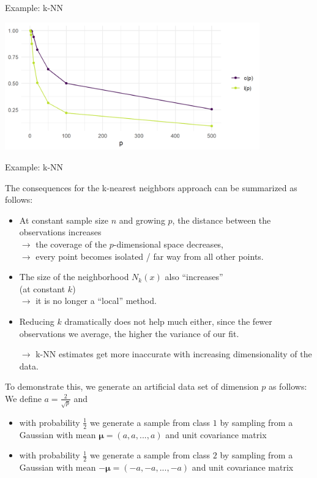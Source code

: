 \begin{vbframe}{Example: k-NN}
\begin{center}
\includegraphics[width = 11cm ]{figure/knn_contrast_locality_plot.png}
\end{center}

\end{vbframe}
\begin{vbframe}{Example: k-NN}


The consequences for the k-nearest neighbors approach can be summarized as follows:

\begin{itemize}
 \item At constant sample size $n$ and growing $p$, the distance between the observations increases\\
 $\rightarrow$ the coverage of the $p$-dimensional space decreases,\\
 $\rightarrow$ every point becomes isolated / far way from all other points.
 \item The size of the neighborhood $N_k(x)$ also \enquote{increases}\\
       (at constant $k$) \\
       $\rightarrow$ it is no longer a \enquote{local} method.
 \item Reducing $k$ dramatically does not help much either,
since the fewer observations we average, the higher the variance of our fit.
 \item[$\rightarrow$] k-NN estimates get more inaccurate with increasing dimensionality of the data.
\end{itemize}

\framebreak

To demonstrate this, we generate an artificial data set of dimension $p$ as follows: We define $a = \frac{2}{\sqrt{p}}$ and 

\begin{itemize}
\item with probability $\frac{1}{2}$ we generate a sample from class $1$ by sampling from a Gaussian with mean $\pmb\mu = (a, a, ..., a)$ and unit covariance matrix
\item with probability $\frac{1}{2}$ we generate a sample from class $2$ by sampling from a  Gaussian with mean $- \pmb\mu = (-a, -a, ..., -a)$ and unit covariance matrix
\end{itemize}



\end{vbframe}
